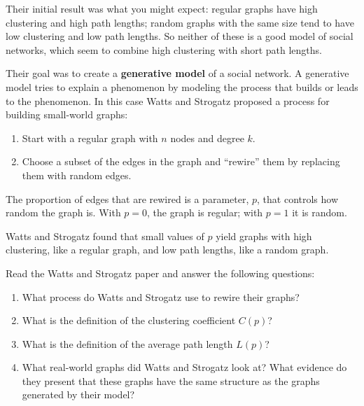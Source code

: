 \documentclass[10pt]{book}
\begin{document}
Their initial result was what you might expect: regular graphs
have high clustering and high path lengths;
random graphs with the same size tend to have low clustering
and low path lengths.  So neither of these is a good model of
social networks, which seem to combine high clustering with
short path lengths.

Their goal was to create a {\bf generative model} of a social
network.  A generative model tries to explain a phenomenon by
modeling the process that builds or leads to the phenomenon.  In
this case Watts and Strogatz proposed a process for building
small-world graphs:

\begin{enumerate}

\item Start with a regular graph with $n$ nodes and degree $k$.

\item Choose a subset of the edges in the graph and ``rewire''
them by replacing them with random edges.

\end{enumerate}

The proportion of edges that are rewired is a parameter, $p$,
that controls how random the graph is.  With $p=0$, the graph
is regular; with $p=1$ it is random.

Watts and Strogatz found that small values of $p$ yield graphs
with high clustering, like a regular graph, and low path
lengths, like a random graph.

\begin{ex}

Read the Watts and Strogatz paper and answer the following
questions:

\begin{enumerate}

\item What process do Watts and Strogatz use to rewire their
graphs?

\item What is the definition of the clustering coefficient $C(p)$?

\item What is the definition of the average path length $L(p)$?

\item What real-world graphs did Watts and Strogatz look at?
What evidence do they present that these graphs have the
same structure as the graphs generated by their model?

\end{enumerate}

\end{ex}  
\end{document}

